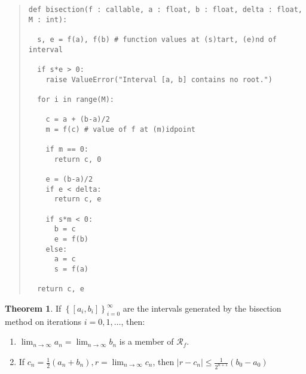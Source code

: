 \documentclass[12pt]{article}
\theoremstyle{definition}
\newtheorem{theorem}{Theorem}
\begin{document}
\small
\begin{quote}

\begin{verbatim}
def bisection(f : callable, a : float, b : float, delta : float, M : int):

  s, e = f(a), f(b) # function values at (s)tart, (e)nd of interval

  if s*e > 0:
    raise ValueError("Interval [a, b] contains no root.")

  for i in range(M):

    c = a + (b-a)/2 
    m = f(c) # value of f at (m)idpoint

    if m == 0:
      return c, 0

    e = (b-a)/2
    if e < delta:
      return c, e

    if s*m < 0:
      b = c 
      e = f(b)
    else:
      a = c 
      s = f(a)
    
  return c, e

\end{verbatim}

\end{quote}
\normalsize

\pagebreak

\begin{theorem}
    If $\left\{ [a_i, b_i] \right\}_{i=0}^\infty $ are the intervals generated
    by the bisection method on iterations $i = 0, 1, \ldots$, then:

    \begin{enumerate}
        \item $\lim_{n\to
    \infty} a_n = \lim_{n \to \infty} b_n$ is a member of $\mathcal{R}_f$.
     \item If $c_n = \frac{1}{2}(a_n + b_n), r = \lim_{n \to \infty} c_n $, then 
         $|r - c_n| \leq \frac{1}{2^{n+1}}(b_0 - a_0)$
    \end{enumerate}

\end{theorem}
\end{document}
